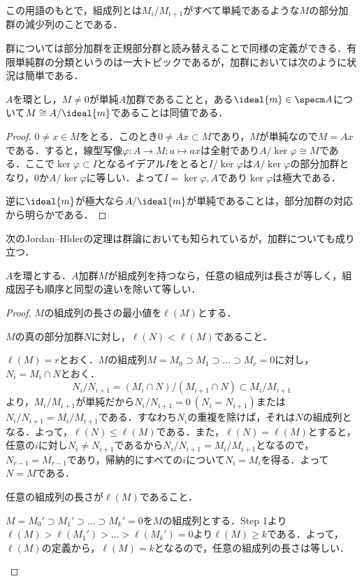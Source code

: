 この用語のもとで，組成列とは$M_i/M_{i+1}$がすべて単純であるような$M$の部分加群の減少列のことである．

群については部分加群を正規部分群と読み替えることで同様の定義ができる．有限単純群の分類というのは一大トピックであるが，加群においては次のように状況は簡単である．

\begin{prop}\label{prop:単純加群の構造}
	$A$を環とし，$M\neq 0$が単純$A$加群であることと，ある$\ideal{m}\in\specm A$について$M\cong A/\ideal{m}$であることは同値である．
\end{prop}

\begin{proof}
	$0\neq x\in M$をとる．このとき$0\neq Ax\subset M$であり，$M$が単純なので$M=Ax$である．すると，線型写像$\varphi:A\to M;a\mapsto ax$は全射であり$A/\ker\varphi\cong M$である．ここで$\ker\varphi\subset I$となるイデアル$I$をとると$I/\ker\varphi$は$A/\ker\varphi$の部分加群となり，$0$か$A/\ker\varphi$に等しい．よって$I=\ker\varphi,A$であり$\ker\varphi$は極大である．
	
	逆に$\ideal{m}$が極大なら$A/\ideal{m}$が単純であることは，部分加群の対応から明らかである．
\end{proof}

次のJordan--Hlderの定理は群論においても知られているが，加群についても成り立つ．
\begin{thm}
	$A$を環とする．$A$加群$M$が組成列を持つなら，任意の組成列は長さが等しく，組成因子も順序と同型の違いを除いて等しい．
\end{thm}

\begin{proof}
	$M$の組成列の長さの最小値を$\ell(M)$とする．
	\begin{step}
		\item $M$の真の部分加群$N$に対し，$\ell(N)<\ell(M)$であること．
		
		$\ell(M)=r$とおく．$M$の組成列$M=M_0\supset M_1\supset\dots\supset M_r=0$に対し，$N_i=M_i\cap N$とおく．
		\[N_i/N_{i+1}=(M_i\cap N)/(M_{i+1}\cap N)\subset M_i/M_{i+1}\]
		より，$M_i/M_{i+1}$が単純だから$N_i/N_{i+1}=0~(N_i=N_{i+1})$または$N_i/N_{i+1}=M_i/M_{i+1}$である．すなわち$N_i$の重複を除けば，それは$N$の組成列となる．よって，$\ell(N)\leq\ell(M)$である．また，$\ell(N)=\ell(M)$とすると，任意の$i$に対し$N_i\neq N_{i+1}$であるから$N_i/N_{i+1}=M_i/M_{i+1}$となるので，$N_{r-1}=M_{r-1}$であり，帰納的にすべての$i$について$N_i=M_i$を得る．よって$N=M$である．
		
		\item 任意の組成列の長さが$\ell(M)$であること．
		
		$M={M_0}'\supset{M_1}'\supset\dots\supset{M_k}'=0$を$M$の組成列とする．Step 1より$\ell(M)>\ell({M_1}')>\dots>\ell({M_k}')=0$より$\ell(M)\geq k$である．よって，$\ell(M)$の定義から，$\ell(M)=k$となるので，任意の組成列の長さは等しい．
	\end{step}
\end{proof}

